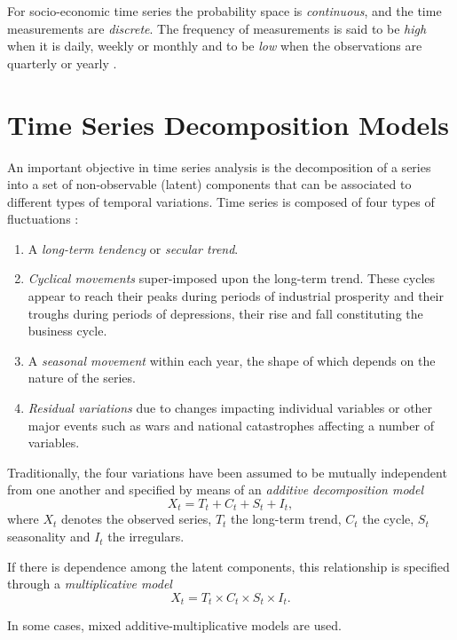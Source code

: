 For socio-economic time series the probability space is \textit{continuous}, and the time measurements are \textit{discrete}. The frequency of measurements is said to be \textit{high} when it is daily, weekly or monthly and to be \textit{low} when the observations are quarterly or yearly \cite{Dagum06}.

\section{Time Series Decomposition Models}

An important objective in time series analysis is the decomposition of a series into a set of non-observable (latent) components that can be associated to different types of temporal variations. Time series is composed of four types of fluctuations \cite{Dagum06}:

\begin{enumerate}
\item A \textit{long-term tendency} or \textit{secular trend}.
\item \textit{Cyclical movements} super-imposed upon the long-term trend. These cycles appear to reach their peaks during periods of industrial prosperity and their troughs during periods of depressions, their rise and fall constituting the business cycle.
\item A \textit{seasonal movement} within each year, the shape of which depends on the nature of the series.
\item \textit{Residual variations} due to changes impacting individual variables or other major events such as wars and national catastrophes affecting a number of variables.
\end{enumerate}
    
Traditionally, the four variations have been assumed to be mutually independent from one another and specified by means of an \textit{additive decomposition model}
$$ X_t = T_t + C_t + S_t + I_t, $$
where $X_t$ denotes the observed series, $T_t$ the long-term trend, $C_t$ the cycle, $S_t$ seasonality and $I_t$ the irregulars.

If there is dependence among the latent components, this relationship is specified through a \textit{multiplicative model}
$$ X_t = T_t \times C_t \times S_t \times I_t. $$

In some cases, mixed additive-multiplicative models are used.

